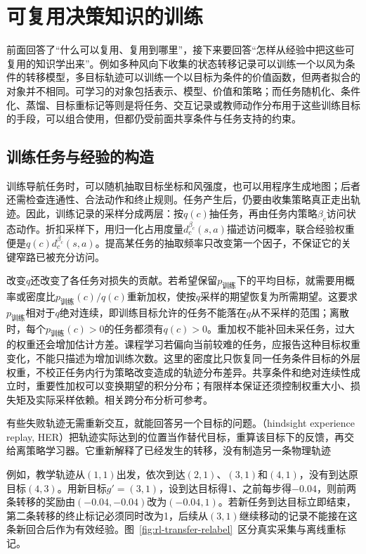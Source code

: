 \section{可复用决策知识的训练}
\label{sec:rl-transfer-training}

前面回答了“什么可以复用、复用到哪里”，接下来要回答“怎样从经验中把这些可复用的知识学出来”。例如多种风向下收集的状态转移记录可以训练一个以风为条件的转移模型，多目标轨迹可以训练一个以目标为条件的价值函数，但两者拟合的对象并不相同。可学习的对象包括表示、模型、价值和策略；而任务随机化、条件化、蒸馏、目标重标记等则是将任务、交互记录或教师动作分布用于这些训练目标的手段，可以组合使用，但都仍受前面共享条件与任务支持的约束。

\subsection{训练任务与经验的构造}
\label{sec:rl-transfer-data}

训练导航任务时，可以随机抽取目标坐标和风强度，也可以用程序生成地图；后者还需检查连通性、合法动作和终止规则。任务产生后，仍要由收集策略真正走出轨迹。因此，训练记录的采样分成两层：按$q(c)$抽任务，再由任务内策略$\beta_c$访问状态动作。折扣采样下，用归一化占用度量$d_c^{\beta_c}(s,a)$描述访问概率，联合经验权重便是$q(c)d_c^{\beta_c}(s,a)$。提高某任务的抽取频率只改变第一个因子，不保证它的关键窄路已被充分访问。

改变$q$还改变了各任务对损失的贡献。若希望保留$p_{\text{训练}}$下的平均目标，就需要用概率或密度比$p_{\text{训练}}(c)/q(c)$重新加权，使按$q$采样的期望恢复为所需期望。这要求$p_{\text{训练}}$相对于$q$绝对连续，即训练目标允许的任务不能落在$q$从不采样的范围；离散时，每个$p_{\text{训练}}(c)>0$的任务都须有$q(c)>0$。重加权不能补回未采任务，过大的权重还会增加估计方差。课程学习若偏向当前较难的任务，应报告这种目标权重变化，不能只描述为增加训练次数。这里的密度比只恢复同一任务条件目标的外层权重，不校正任务内行为策略改变造成的轨迹分布差异。共享条件和绝对连续性成立时，重要性加权可以变换期望的积分分布；有限样本保证还须控制权重大小、损失矩及实际采样依赖。相关跨分布分析可参考。

有些失败轨迹无需重新交互，就能回答另一个目标的问题。（hindsight experience replay, HER）把轨迹实际达到的位置当作替代目标，重算该目标下的反馈，再交给离策略学习器。它重新解释了已经发生的转移，没有制造另一条物理轨迹

例如，教学轨迹从$(1,1)$出发，依次到达$(2,1)$、$(3,1)$和$(4,1)$，没有到达原目标$(4,3)$。用新目标$g'=(3,1)$，设到达目标得1、之前每步得$-0.04$，则前两条转移的奖励由$(-0.04,-0.04)$改为$(-0.04,1)$。若新任务到达目标立即结束，第二条转移的终止标记必须同时改为1，后续从$(3,1)$继续移动的记录不能接在这条新回合后作为有效经验。图~\ref{fig:rl-transfer-relabel}~区分真实采集与离线重标记。

